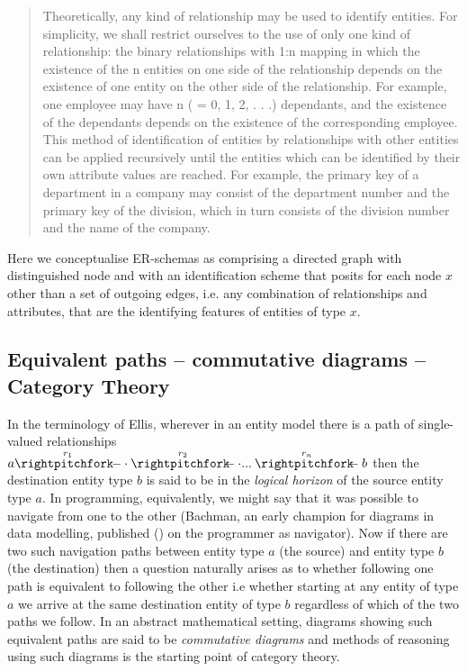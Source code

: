 \begin{quote}
Theoretically, any kind of relationship may be used to identify entities. For
simplicity, we shall restrict ourselves to the use of only one kind of relationship:
the binary relationships with 1:n mapping in which the existence of the n entities
on one side of the relationship depends on the existence of one entity on the other
side of the relationship. For example, one employee may have n ( = 0, 1, 2, . . .)
dependants, and the existence of the dependants depends on the existence of the
corresponding employee.
This method of identification of entities by relationships with other entities can
be applied recursively until the entities which can be identified by their own attribute
values are reached. For example, the primary key of a department in a
company may consist of the department number and the primary key of the
division, which in turn consists of the division number and the name of the company.
\end{quote}

Here we conceptualise ER-schemas as comprising a directed graph with distinguished 
node \veee and with an identification scheme that posits for each node $x$ other than \veee
a set of outgoing edges, i.e. any combination of relationships and attributes, that are
the identifying features of entities of type $x$.
\iffalse
An identifying set of features  $i_1,...i_n$ for an entity type $x$ specifies a jointly injective set of functions(the set of functions $f_1,...f_n$ are said to be jointly injective iff the function:
$$
\tuple{f_1,f2,,,,f_n}: x \morph \veee \times \veee ... \times \veee
$$
is injective).
\fi

\subsection{Equivalent paths -- commutative diagrams -- Category Theory}
In the terminology of Ellis\cite{ellis1982}, wherever in an entity model there is a path of single-valued relationships 
$\overset{r_1}{a \rightpitchfork \hspace{-0.35em} -  \cdot} \overset{r_2}{\rightpitchfork \hspace{-0.35em} -} \cdot ... \overset{r_n}{\rightpitchfork \hspace{-0.35em} -} b$
then the destination entity type $b$ is said to be in the \textit{logical horizon}  of the source entity type $a$. In programming, equivalently, 
we might say that it was possible to navigate from one to the other (Bachman, an early champion for diagrams in data modelling, published (\cite{Bachman1973}) on the programmer as navigator). Now if there are two such navigation paths between entity type $a$ (the source) and entity type $b$ (the destination) then a question naturally arises as to whether following one path is equivalent to
following the other i.e whether starting at any entity of type $a$ we arrive at the same destination entity of type $b$ regardless of which of the two paths we follow. In an abstract mathematical setting, diagrams showing such equivalent
paths are said to be \textit{commutative diagrams} and methods of reasoning using such diagrams is the starting point of category theory. 

